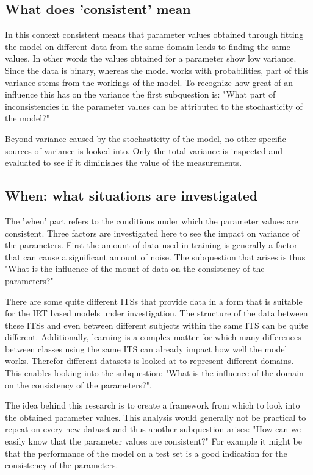 \documentclass{scrartcl}
\begin{document}
\subsection{What does 'consistent' mean}
In this context consistent means that parameter values obtained through fitting the model on different data from the same domain leads to finding the same values. In other words the values obtained for a parameter show low variance. Since the data is binary, whereas the model works with probabilities, part of this variance stems from the workings of the model. To recognize how great of an influence this has on the variance the first subquestion is: "What part of inconsistencies in the parameter values can be attributed to the stochasticity of the model?"

Beyond variance caused by the stochasticity of the model, no other specific sources of variance is looked into. Only the total variance is inspected and evaluated to see if it diminishes the value of the measurements.

\subsection{When: what situations are investigated}
The 'when' part refers to the conditions under which the parameter values are consistent. Three factors are investigated here to see the impact on variance of the parameters. First the amount of data used in training is generally a factor that can cause a significant amount of noise. The subquestion that arises is thus "What is the influence of the mount of data on the consistency of the parameters?" 

There are some quite different ITSs that provide data in a form that is suitable for the IRT based models under investigation. The structure of the data between these ITSs and even between different subjects within the same ITS can be quite different. Additionally, learning is a complex matter for which many differences between classes using the same ITS can already impact how well the model works. Therefor different datasets is looked at to represent different domains. This enables looking into the subquestion: "What is the influence of the domain on the consistency of the parameters?".

The idea behind this research is to create a framework from which to look into the obtained parameter values. This analysis would generally not be practical to repeat on every new dataset and thus another subquestion arises: "How can we easily know that the parameter values are consistent?" For example it might be that the performance of the model on a test set is a good indication for the consistency of the parameters.
\end{document}
